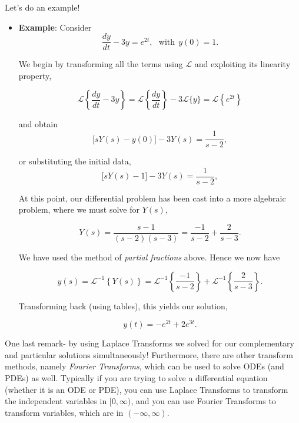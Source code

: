 \begin{itemize}
Let's do an example!

\begin{itemize}
\item[] {\bf{Example}}: Consider $$\frac{dy}{dt} - 3y = e^{2t}, \ \ \ \mbox{with} \ \ y(0)=1.$$

We begin by transforming all the terms using $\mathscr{L}$ and exploiting its linearity property,

$$\mathscr{L}\left\{ \frac{dy}{dt} - 3y \right\} = \mathscr{L}\left\{ \frac{dy}{dt} \right\} - 3\mathscr{L}\{ y \} = \mathscr{L}\left\{ e^{2t} \right\}$$

and obtain $$\Big[sY(s) - y(0) \Big] - 3Y(s) = \frac{1}{s-2},$$

or substituting the initial data,  $$\Big[sY(s) - 1 \Big] - 3Y(s) = \frac{1}{s-2},$$

At this point, our differential problem has been cast into a more algebraic problem, where we must solve for $Y(s)$, 

$$Y(s) = \frac{s-1}{ (s-2)(s-3) } = \frac{-1}{s-2} + \frac{2}{s-3}.$$

We have used the method of \emph{partial fractions} above. Hence we now have 

$$y(s) = \mathscr{L}^{-1}\left\{ Y(s) \right\} =  \mathscr{L}^{-1}\left\{  \frac{-1}{s-2} \right\}  +  \mathscr{L}^{-1}\left\{  \frac{2}{s-3} \right\}.$$

Transforming back (using tables), this yields our solution,

$$y(t) = -e^{2t} + 2e^{3t}.$$

\end{itemize}
\end{itemize} %

One last remark- by using Laplace Transforms we solved for our complementary and particular solutions simultaneously! Furthermore, there are other transform methods, namely \emph{Fourier Transforms}, which can be used to solve ODEs (and PDEs) as well. Typically if you are trying to solve a differential equation (whether it is an ODE or PDE), you can use Laplace Transforms to transform the independent variables in $[0,\infty)$, and you can use Fourier Transforms to transform variables, which are in $(-\infty,\infty)$.









%
%
%
%

